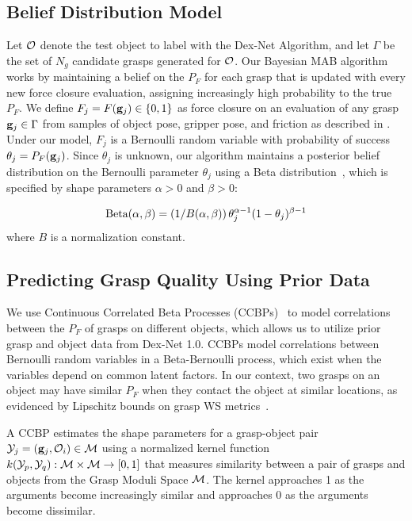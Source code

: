 \subsection{Belief Distribution Model}
Let $\mathcal{O}$ denote the test object to label with the Dex-Net Algorithm, and let $\Gamma$ be the set of $N_g$ candidate grasps generated for $\mathcal{O}$.
Our Bayesian MAB algorithm works by maintaining a belief on the $P_F$ for each grasp that is updated with every new force closure evaluation, assigning increasingly high probability to the true $P_F$. 
We define $F_{j} = F(\mathbf{g}_{j}) \in \{0, 1\}$ as force closure on an evaluation of any grasp $\mathbf{g}_{j} \in \Gamma$ from samples of object pose, gripper pose, and friction as described in .
Under our model, $F_j$ is a Bernoulli random variable with probability of success $\theta_{j}= P_F(\mathbf{g}_{j})$.
Since $\theta_j$ is unknown, our algorithm maintains a posterior belief distribution on the Bernoulli parameter $\theta_{j}$ using a Beta distribution~\cite{hoffman2013exploiting, laskey2015bandits}, which is specified by shape parameters $\alpha > 0$ and $\beta > 0$:

\vspace{-4ex}
\begin{align*}
	\text{Beta}(\alpha, \beta) = \left( 1 / B(\alpha, \beta) \right) \theta_j^{\alpha-1} (1 - \theta_j)^{\beta-1}
\end{align*}
\noindent where $B$ is a normalization constant.

\subsection{Predicting Grasp Quality Using Prior Data}
We use Continuous Correlated Beta Processes (CCBPs)~\cite{goetschalckx2011continuous, montesano2012active} to model correlations between the $P_F$ of grasps on different objects, which allows us to utilize prior grasp and object data from Dex-Net 1.0.
CCBPs model correlations between Bernoulli random variables in a Beta-Bernoulli process, which exist when the variables depend on common latent factors.
In our context, two grasps on an object may have similar $P_F$ when they contact the object at similar locations, as evidenced by Lipschitz bounds on grasp WS metrics~\cite{pokorny2013c}.

A CCBP estimates the shape parameters for a grasp-object pair $\mathcal{Y}_{j} = (\mathbf{g}_{j}, \mathcal{O}_{i}) \in \mathcal{M}$ using a normalized kernel function $k(\mathcal{Y}_p, \mathcal{Y}_q) : \mathcal{M} \times \mathcal{M} \rightarrow [0,1]$ that measures similarity between a pair of grasps and objects from the Grasp Moduli Space $\mathcal{M}$.
The kernel approaches 1 as the arguments become increasingly similar and approaches 0 as the arguments become dissimilar.

